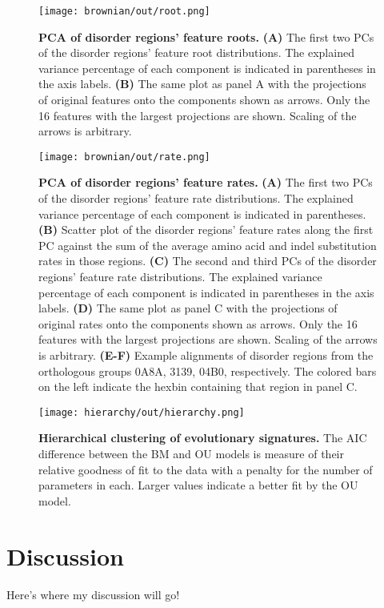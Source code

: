 \begin{figure}[h!]
\texttt{[image: brownian/out/root.png]}
\centering
\caption{\textbf{PCA of disorder regions' feature roots.}
\textbf{(A)} The first two PCs of the disorder regions' feature root distributions. The explained variance percentage of each component is indicated in parentheses in the axis labels. \textbf{(B)} The same plot as panel A with the projections of original features onto the components shown as arrows. Only the 16 features with the largest projections are shown. Scaling of the arrows is arbitrary.}
\label{fig:root}
\end{figure}

\begin{figure}[h!]
\texttt{[image: brownian/out/rate.png]}
\centering
\caption{\textbf{PCA of disorder regions' feature rates.}
\textbf{(A)} The first two PCs of the disorder regions' feature rate distributions. The explained variance percentage of each component is indicated in parentheses. \textbf{(B)} Scatter plot of the disorder regions' feature rates along the first PC against the sum of the average amino acid and indel substitution rates in those regions. \textbf{(C)} The second and third PCs of the disorder regions' feature rate distributions. The explained variance percentage of each component is indicated in parentheses in the axis labels. \textbf{(D)} The same plot as panel C with the projections of original rates onto the components shown as arrows. Only the 16 features with the largest projections are shown. Scaling of the arrows is arbitrary. \textbf{(E-F)} Example alignments of disorder regions from the orthologous groups 0A8A, 3139, 04B0, respectively. The colored bars on the left indicate the hexbin containing that region in panel C.}
\label{fig:rate}
\end{figure}

\begin{figure}[h!]
\texttt{[image: hierarchy/out/hierarchy.png]}
\centering
\caption{\textbf{Hierarchical clustering of evolutionary signatures.}
The AIC difference between the BM and OU models is measure of their relative goodness of fit to the data with a penalty for the number of parameters in each. Larger values indicate a better fit by the OU model.}
\label{fig:hierarchy}
\end{figure}

\section{Discussion}
Here's where my discussion will go!

